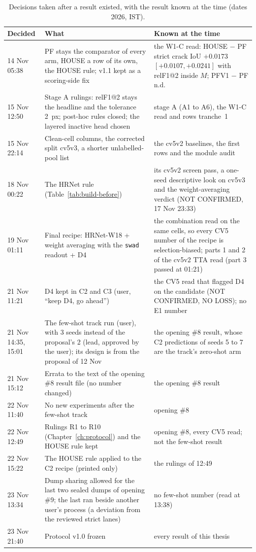 \begin{table}[htbp]
\centering
\small
\caption{Decisions taken after a result existed, with the result known at the time (dates 2026, IST).}
\label{tab:build-after}
\begin{tabular}{@{}p{2.3cm}p{5.8cm}p{5.9cm}@{}}
\toprule
Decided & What & Known at the time \\
\midrule
14 Nov 05:38 & PF stays the comparator of every arm, HOUSE a row of its own, the HOUSE rule; v1.1 kept as a scoring-side fix &
the W1-C read: HOUSE $-$ PF strict crack IoU $+0.0173$ $[+0.0107, +0.0241]$ with relF1@2 inside $M$; PFV1 $-$ PF n.d. \\
15 Nov 12:50 & Stage A rulings: relF1@2 stays the headline and the tolerance 2~px; post-hoc rules closed; the layered inactive
head chosen & stage A (A1 to A6), the W1-C read and rows tranche~1 \\
15 Nov 22:14 & Clean-cell columns, the corrected split cv5v3, a shorter unlabelled-pool list & the cv5v2 baselines, the first rows and
the module audit \\
18 Nov 00:22 & The HRNet rule (Table~\ref{tab:build-before}) & its cv5v2 screen pass, a one-seed descriptive look on cv5v3 and
the weight-averaging verdict (NOT CONFIRMED, 17 Nov 23:33) \\
19 Nov 01:11 & Final recipe: HRNet-W18 + weight averaging with the \texttt{swad} readout + D4 & the combination read on the same
cells, so every CV5 number of the recipe is selection-biased; parts 1 and 2 of the cv5v2 TTA read (part 3 passed at 01:21) \\
21 Nov 11:21 & D4 kept in C2 and C3 (user, ``keep D4, go ahead'') & the CV5 read that flagged D4 on the candidate (NOT
CONFIRMED, NO LOSS); no E1 number \\
21 Nov 14:35, 15:01 & The few-shot track run (user), with 3 seeds instead of the proposal's 2 (lead, approved by the user);
its design is from the proposal of 12 Nov & the opening \#8 result, whose C2 predictions of seeds 5 to 7 are the track's
zero-shot arm \\
21 Nov 15:12 & Errata to the text of the opening \#8 result file (no number changed) & the opening \#8 result \\
22 Nov 11:40 & No new experiments after the few-shot track & opening \#8 \\
22 Nov 12:49 & Rulings R1 to R10 (Chapter~\ref{ch:protocol}) and the HOUSE rule kept & opening \#8, every CV5 read; not the
few-shot result \\
22 Nov 15:22 & The HOUSE rule applied to the C2 recipe (printed only) & the rulings of 12:49 \\
23 Nov 13:34 & Dump sharing allowed for the last two sealed dumps of opening \#9; the last ran beside another user's process (a
deviation from the reviewed strict lanes) &
no few-shot number (read at 13:38) \\
23 Nov 21:40 & Protocol v1.0 frozen & every result of this thesis \\
\bottomrule
\end{tabular}
\end{table}

